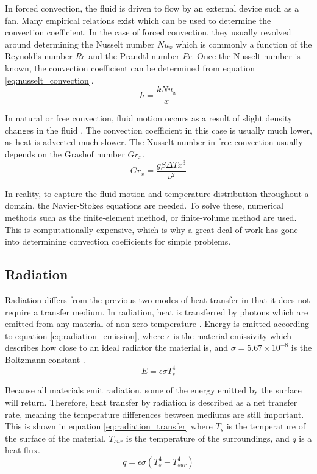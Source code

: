 In forced convection, the fluid is driven to flow by an external device such as a fan. Many empirical relations exist which can be used to determine the convection coefficient. In the case of forced convection, they usually revolved around determining the Nusselt number $\textit{Nu}_x$ which is commonly a function of the Reynold's number $\textit{Re}$ and the Prandtl number $\textit{Pr}$. Once the Nusselt number is known, the convection coefficient can be determined from equation \ref{eq:nusselt_convection}.
\begin{equation}
	h = \frac{k\textit{Nu}_x}{x}
	\label{eq:nusselt_convection}
\end{equation}

In natural or free convection, fluid motion occurs as a result of slight density changes in the fluid \cite{Bergman_2011}. The convection coefficient in this case is usually much lower, as heat is advected much slower. The Nusselt number in free convection usually depends on the Grashof number $\textit{Gr}_x$.
\begin{equation}
	\textit{Gr}_x = \frac{g\beta\Delta T x^3}{\nu^2}
	\label{eq:grashof_number}
\end{equation}

In reality, to capture the fluid motion and temperature distribution throughout a domain, the Navier-Stokes equations are needed. To solve these, numerical methods such as the finite-element method, or finite-volume method are used. This is computationally expensive, which is why a great deal of work has gone into determining convection coefficients for simple problems.

\subsection*{Radiation}
Radiation differs from the previous two modes of heat transfer in that it does not require a transfer medium. In radiation, heat is transferred by photons which are emitted from any material of non-zero temperature \cite{Bergman_2011}. Energy is emitted according to equation \ref{eq:radiation_emission}, where $\epsilon$ is the material emissivity which describes how close to an ideal radiator the material is, and $\sigma=5.67\times 10^{-8}$ is the Boltzmann constant \cite{Bergman_2011}. 
\begin{equation}
	E = \epsilon\sigma T_s^4
	\label{eq:radiation_emission}
\end{equation}

Because all materials emit radiation, some of the energy emitted by the surface will return. Therefore, heat transfer by radiation is described as a net transfer rate, meaning the temperature differences between mediums are still important. This is shown in equation \ref{eq:radiation_transfer} where $T_s$ is the temperature of the surface of the material, $T_{sur}$ is the temperature of the surroundings, and $q$ is a heat flux.
\begin{equation}
	q = \epsilon\sigma(T_s^4 - T_{sur}^4)
	\label{eq:radiation_transfer}
\end{equation}


